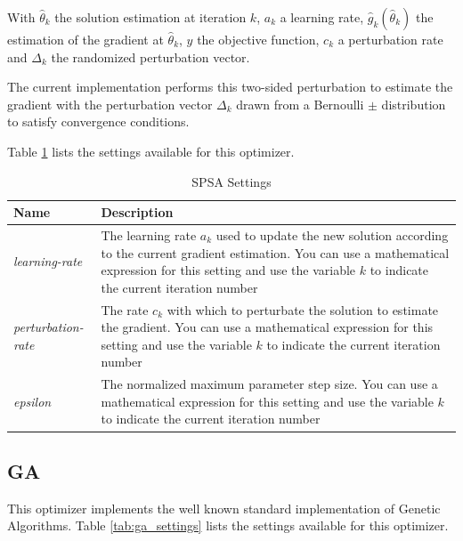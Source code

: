 \documentclass{report}
\begin{document}
With $\hat{\theta}_k$ the solution estimation at iteration $k$, $a_k$ a learning
rate, $\hat{g}_k(\hat{\theta}_k)$ the estimation of the gradient at
$\hat{\theta}_k$, $y$ the objective function, $c_k$ a perturbation rate and
$\Delta_k$ the randomized perturbation vector.

The current implementation performs this two-sided perturbation to estimate the
gradient with the perturbation vector $\Delta_k$ drawn from a Bernoulli $\pm$
distribution to satisfy convergence conditions.

Table \ref{tab:spsa_settings} lists the settings available for this optimizer.

\begin{table}[h!tb]\caption{SPSA Settings}\label{tab:spsa_settings}\vspace{0.1in}
	\centering

	\begin{tabular}{p{4cm} p{12cm}}
		\toprule
		\textbf{Name} & \textbf{Description} \\
		\midrule
		\textit{learning-rate} & The learning rate $a_k$ used to update the
		                         new solution according to the current gradient
		                         estimation. You can use a mathematical
		                         expression for this setting and use the
		                         variable $k$ to indicate the current iteration
		                         number \\
		\textit{perturbation-rate} & The rate $c_k$ with which to perturbate the
		                             solution to estimate the gradient. You
		                             can use a mathematical expression for this
		                             setting and use the variable $k$ to
		                             indicate the current iteration number \\
		\textit{epsilon} & The normalized maximum parameter step size. You
		                    can use a mathematical expression for this
		                    setting and use the variable $k$ to indicate the
		                    current iteration number \\
		\bottomrule
	\end{tabular}
\end{table}

\subsection{GA}
This optimizer implements the well known standard implementation of
Genetic Algorithms. Table \ref{tab:ga_settings} lists the settings available
for this optimizer.
\end{document}
